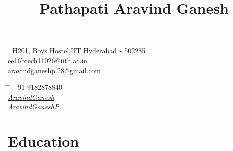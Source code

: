 \documentclass[11pt]{article} %
\newlength\myheight
\newlength\mydepth
\begin{document}

\title{Pathapati Aravind Ganesh} %


\parbox{0.5\textwidth}{ %
\begin{tabbing} %
\hspace{3cm} \= \hspace{4cm} \= \kill %
\faMapMarker \hspace{2} H201, Boys Hostel,IIT Hyderabad - 502285  \\ 
\faEnvelope \hspace{2} \href{mailto:ee16btech11026@iith.ac.in}{ee16btech11026@iith.ac.in}\\
\faEnvelope \hspace{2} \href{mailto:aravindganeshp.28@gmail.com}{aravindganeshp.28@gmail.com}
\end{tabbing}}
\hfill %
\parbox{0.5\textwidth}{ %
\begin{tabbing} %
\hspace{0.5cm} \= \hspace{0.5cm} \= \kill %
\faPhone \> +91 9182878840 \\ %
\faGithub \> \href{https://github.com/AravindGanesh}{\textit{AravindGanesh}} \\
\faLinkedin \> \href{https://www.linkedin.com/in/AravindGaneshP}{\textit{AravindGaneshP}}
\end{tabbing}}

\hline

\section{Education}

\end{document}
